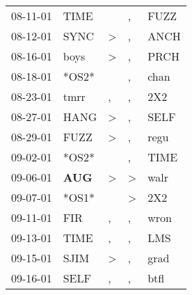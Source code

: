 \begin{supertabular}{p{0.07\textwidth}p{0.06\textwidth}p{0.02\textwidth}p{0.02\textwidth}p{0.06\textwidth}}
          08-11-01\textsuperscript{} &           TIME\textsuperscript{} &                  &             , &           FUZZ\textsuperscript{} \\
          08-12-01\textsuperscript{} &           SYNC\textsuperscript{} &     \textgreater &             , &           ANCH\textsuperscript{} \\
          08-16-01\textsuperscript{} &           boys\textsuperscript{} &     \textgreater &             , &           PRCH\textsuperscript{} \\
          08-18-01\textsuperscript{} &                            *OS2* &                  &             , &           chan\textsuperscript{} \\
          08-23-01\textsuperscript{} &           tmrr\textsuperscript{} &                , &             , &            2X2\textsuperscript{} \\
          08-27-01\textsuperscript{} &           HANG\textsuperscript{} &     \textgreater &             , &           SELF\textsuperscript{} \\
          08-29-01\textsuperscript{} &           FUZZ\textsuperscript{} &     \textgreater &             , &           regu\textsuperscript{} \\
          09-02-01\textsuperscript{} &                            *OS2* &                  &             , &           TIME\textsuperscript{} \\
          09-06-01\textsuperscript{} &   \textbf{AUG\textsuperscript{}} &     \textgreater &  \textgreater &           walr\textsuperscript{} \\
          09-07-01\textsuperscript{} &                            *OS1* &                  &  \textgreater &            2X2\textsuperscript{} \\
          09-11-01\textsuperscript{} &            FIR\textsuperscript{} &                , &             , &           wron\textsuperscript{} \\
          09-13-01\textsuperscript{} &           TIME\textsuperscript{} &                , &             , &            LMS\textsuperscript{} \\
          09-15-01\textsuperscript{} &           SJIM\textsuperscript{} &     \textgreater &             , &           grad\textsuperscript{} \\
          09-16-01\textsuperscript{} &           SELF\textsuperscript{} &                , &             , &           btfl\textsuperscript{} \\

\end{supertabular}
